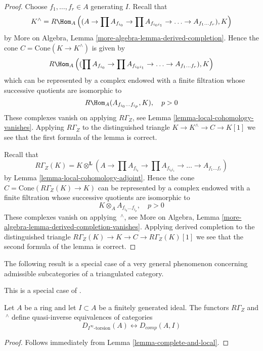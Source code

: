 \begin{proof}
Choose $f_1, \ldots, f_r \in A$ generating $I$. Recall that
$$
K^\wedge = R\Hom_A\left((A \to \prod A_{f_{i_0}}
\to \prod A_{f_{i_0i_1}} \to \ldots \to A_{f_1 \ldots f_r}), K\right)
$$
by More on Algebra, Lemma \ref{more-algebra-lemma-derived-completion}.
Hence the cone $C = \text{Cone}(K \to K^\wedge)$
is given by
$$
R\Hom_A\left((\prod A_{f_{i_0}}
\to \prod A_{f_{i_0i_1}} \to \ldots \to A_{f_1 \ldots f_r}), K\right)
$$
which can be represented by a complex endowed with a finite filtration
whose successive quotients are isomorphic to
$$
R\Hom_A(A_{f_{i_0} \ldots f_{i_p}}, K), \quad p > 0
$$
These complexes vanish on applying $R\Gamma_Z$, see
Lemma \ref{lemma-local-cohomology-vanishes}. Applying $R\Gamma_Z$
to the distinguished triangle $K \to K^\wedge \to C \to K[1]$
we see that the first formula of the lemma is correct.

\medskip\noindent
Recall that
$$
R\Gamma_Z(K) =
K \otimes^\mathbf{L} (A \to \prod A_{f_{i_0}}
\to \prod A_{f_{i_0i_1}} \to \ldots \to A_{f_1 \ldots f_r})
$$
by Lemma \ref{lemma-local-cohomology-adjoint}.
Hence the cone $C = \text{Cone}(R\Gamma_Z(K) \to K)$
can be represented by a complex endowed with a finite filtration
whose successive quotients are isomorphic to
$$
K \otimes_A A_{f_{i_0} \ldots f_{i_p}}, \quad p > 0
$$
These complexes vanish on applying ${\ }^\wedge$, see
More on Algebra, Lemma \ref{more-algebra-lemma-derived-completion-vanishes}.
Applying derived completion to the distinguished triangle
$R\Gamma_Z(K) \to K \to C \to R\Gamma_Z(K)[1]$
we see that the second formula of the lemma is correct.
\end{proof}

\noindent
The following result is a special case of a very general phenomenon
concerning admissible subcategories of a triangulated category.

\begin{proposition}
\label{proposition-torsion-complete}
\begin{reference}
This is a special case of \cite[Theorem 1.1]{Porta-Liran-Yekutieli}.
\end{reference}
Let $A$ be a ring and let $I \subset A$ be a finitely generated ideal.
The functors $R\Gamma_Z$ and ${\ }^\wedge$
define quasi-inverse equivalences of categories
$$
D_{I^\infty\text{-torsion}}(A) \leftrightarrow D_{comp}(A, I)
$$
\end{proposition}

\begin{proof}
Follows immediately from Lemma \ref{lemma-complete-and-local}.
\end{proof}

